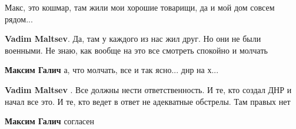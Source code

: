 \begin{itemize}
 
Макс, это кошмар, там жили мои хорошие товарищи, да и мой дом совсем рядом...

\begin{itemize}
 
\textbf{Vadim Maltsev}. Да, там у каждого из нас жил друг. Но они не были военными. Не знаю, как вообще на это все смотреть спокойно и молчать

 
\textbf{Максим Галич} а, что молчать, все и так ясно... днр на х...

 
\textbf{Vadim Maltsev} . Все должны нести ответственность. И те, кто создал ДНР и начал все это. И те, кто ведет в ответ не адекватные обстрелы. Там правых нет

 
\textbf{Максим Галич} согласен

 


\end{itemize}
\end{itemize}
